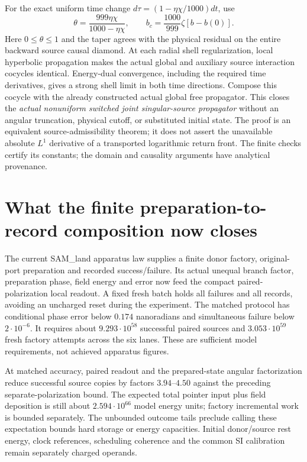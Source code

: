 For the exact uniform time change $d\tau=(1-\eta\chi/1000)dt$, use
\[
 \theta=\frac{999\eta\chi}{1000-\eta\chi},\qquad
 b_c=\frac{1000}{999}\zeta[b-b(0)].
\]
Here $0\le\theta\le1$ and the taper agrees with the physical residual on
the entire backward source causal diamond. At each radial shell
regularization, local hyperbolic propagation makes the actual global
and auxiliary source interaction cocycles identical. Energy-dual
convergence, including the required time derivatives, gives a strong
shell limit in both time directions. Compose this cocycle with the
already constructed actual global free propagator. This closes the
\emph{actual nonuniform switched joint singular-source propagator} without
an angular truncation, physical cutoff, or substituted initial state.
The proof is an equivalent source-admissibility theorem; it does not
assert the unavailable absolute $L^1$ derivative of a transported
logarithmic return front. The finite checks certify its constants;
the domain and causality arguments have analytical provenance.

\section{What the finite preparation-to-record composition now closes}
\label{sec:preparation7-status}
The current SAM\_land apparatus law supplies a finite donor factory,
original-port preparation and recorded success/failure. Its actual
unequal branch factor, preparation phase, field energy and error now
feed the compact paired-polarization local readout. A fixed fresh batch
holds all failures and all records, avoiding an uncharged reset during
the experiment. The matched protocol has conditional phase error below
$0.174$ nanoradians and simultaneous failure below $2\cdot10^{-6}$.
It requires about $9.293\cdot10^{58}$ successful paired sources and
$3.053\cdot10^{59}$ fresh factory attempts across the six lanes.
These are sufficient model requirements, not achieved apparatus figures.

At matched accuracy, paired readout and the prepared-state angular
factorization reduce successful source copies by factors $3.94$--$4.50$
against the preceding separate-polarization bound. The expected total
pointer input plus field deposition is still about $2.594\cdot10^{66}$
model energy units; factory incremental work is bounded separately.
The unbounded outcome tails preclude calling these expectation bounds
hard storage or energy capacities. Initial donor/source rest energy,
clock references, scheduling coherence and the common SI calibration
remain separately charged operands.

